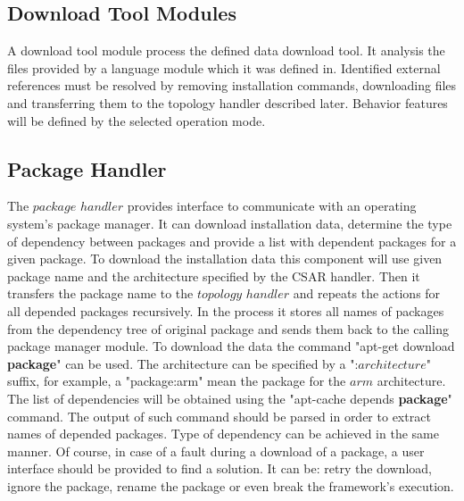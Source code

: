 \subsection{Download Tool Modules}
A download tool module process the defined data download tool.
It analysis the files provided by a language module which it was defined in.
Identified external references must be resolved by removing installation commands, downloading files and transferring them to the topology handler described later.
Behavior features will be defined by the selected operation mode.

\subsection{Package Handler} \label{subs:archph}
The $package$ $handler$ provides interface to communicate with an operating system's package manager. 
It can download installation data, determine the type of dependency between packages and provide a list with dependent packages for a given package.
To download the installation data this component will use given package name and the architecture specified by the CSAR handler.
Then it transfers the package name to the $topology$ $handler$ and repeats the actions for all depended packages recursively. 
In the process it stores all names of packages from the dependency tree of original package and sends them back to the calling package manager module.
To download the data the command "apt-get download \textbf{package}" can be used. 
The architecture can be specified by a ":$architecture$" suffix, for example, a "package:arm" mean the package for the $arm$ architecture.
The list of dependencies will be obtained using the "apt-cache depends \textbf{package}" command. 
The output of such command should be parsed in order to extract names of depended packages.
Type of dependency can be achieved in the same manner.
Of course, in case of a fault during a download of a package, a user interface should be provided to find a solution.
It can be: retry the download, ignore the package, rename the package or even break the framework's execution.

